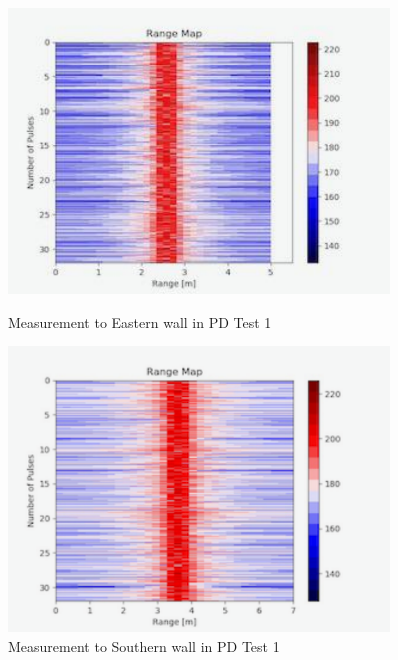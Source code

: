 \begin{figure}[h!]
    \centering
    \begin{minipage}{0.45\textwidth}
        \centering
        \includegraphics[width = 0.9\textwidth]{images/pulsedTest1-3.pdf}
        \caption{Measurement to Eastern wall in PD Test 1}\label{fig:PDResults3}
    \end{minipage}\hfill
    \begin{minipage}{0.45\textwidth}
        \centering
        \includegraphics[width=0.9\textwidth]{images/pulsedTest1-4.pdf}
        \caption{Measurement to Southern wall in PD Test 1}\label{fig:PDResults4}
    \end{minipage}
\end{figure}

\newpage